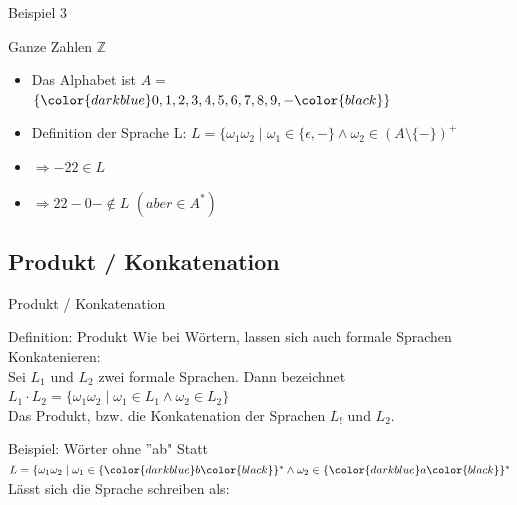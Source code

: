 	
	\begin{frame} {Beispiel 3}
		\begin{exampleblock}{Ganze Zahlen $\mathbb{Z}$}
			\begin{itemize}
				\item Das Alphabet ist $A =$ 
				\visible<2->
				{$\{\color{darkblue}0,1,2,3,4,5,6,7,8,9,-\color{black}\}$}
				\pause
				\item Definition der Sprache L: 
				\visible<3->
				{$L= \{ \omega_1 \omega_2 \; | \; \omega_1 \in \{\epsilon, -\} \land \omega_2 \in (A \! \setminus \! \{-\})^+$}
				\pause
				\item $\Rightarrow -22 \in L$
				\pause
				\item $\Rightarrow 22-0- \not\in L$ $(aber \in A^*)$
				
			\end{itemize}
		\end{exampleblock}
	\end{frame}
	
	
	\subsection{Produkt / Konkatenation}
	\begin{frame} {Produkt / Konkatenation}
		\begin{block}{Definition: Produkt}
			Wie bei Wörtern, lassen sich auch formale Sprachen Konkatenieren:\\
			Sei $L_1$ und $L_2$ zwei formale Sprachen. Dann bezeichnet\\
			\vspace{5pt}
			\hspace{10pt}			
			$L_1 \cdot L_2 = \{\omega_1 \omega_2 \; | \; \omega_1 \in L_1 \land \omega_2 \in L_2\}$\\
			\vspace{5pt}
			Das Produkt, bzw. die Konkatenation der Sprachen $L_!$ und $L_2$.
		\end{block}
		
		\pause		
		
		\begin{exampleblock}{Beispiel: Wörter ohne ''ab"}
			Statt $L=\{ \omega_1 \omega_2 \; | \; \omega_1 \in \{\color{darkblue}b \color{black}\}^* \land\omega_2 \in \{\color{darkblue}a \color{black}\}^*$ \\
			Lässt sich die Sprache schreiben als: 
			\visible<2>{$L = \{a\}^*\{b\}^*$}
		\end{exampleblock}
	\end{frame}


